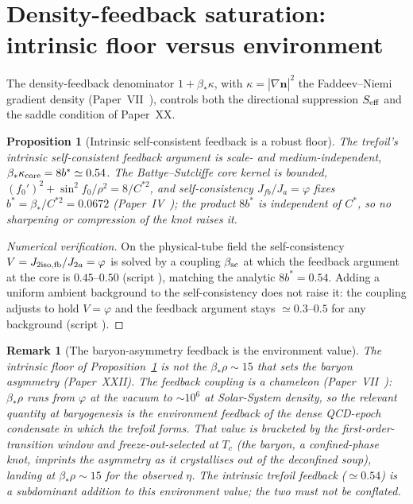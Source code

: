 \documentclass[11pt,a4paper]{article}
\newtheorem{proposition}[theorem]{Proposition}
\newtheorem{remark}[theorem]{Remark}
\theoremstyle{definition}\newtheorem{definition}[theorem]{Definition}
\newcommand{\vp}{\varphi}
\newcommand{\nhat}{\hat{\mathbf{n}}}
\begin{document}
\section{Density-feedback saturation: intrinsic floor versus environment}
\label{P23:sec:feedback}
The density-feedback denominator $1+\beta_*\kappa$, with $\kappa=|\nabla\nhat|^2$ the
Faddeev--Niemi gradient density (Paper~VII~\cite{Paper7}), controls both the directional
suppression $S_{\rm eff}$ and the saddle condition of Paper~XX.

\begin{proposition}[Intrinsic self-consistent feedback is a robust floor]
\label{P23:prop:floor}
The trefoil's \emph{intrinsic} self-consistent feedback argument is scale- and
medium-independent, $\beta_*\kappa_{\rm core}=8b^\ast\simeq0.54$. The Battye--Sutcliffe core
kernel is bounded, $(f_0')^2+\sin^2\!f_0/\rho^2=8/C^{\ast2}$, and self-consistency
$J_{fb}/J_a=\vp$ fixes $b^\ast=\beta_*/C^{\ast2}=0.0672$ (Paper~IV~\cite{Paper4}); the product
$8b^\ast$ is independent of $C^\ast$, so no sharpening or compression of the knot raises it.
\end{proposition}

\begin{proof}[Numerical verification]
On the physical-tube field the self-consistency $V=J_{2\rm iso,fb}/J_{2a}=\vp$ is solved by a
coupling $\beta_{\rm sc}$ at which the feedback argument at the core is $0.45$--$0.50$ (script
), matching the analytic $8b^\ast=0.54$. Adding a uniform ambient
background to the self-consistency does not raise it: the coupling adjusts to hold $V=\vp$ and the
feedback argument stays $\simeq0.3$--$0.5$ for any background (script ).
\end{proof}

\begin{remark}[The baryon-asymmetry feedback is the environment value]
\label{P23:rem:environment}
The intrinsic floor of Proposition~\ref{P23:prop:floor} is \emph{not} the $\beta_*\rho\sim15$ that
sets the baryon asymmetry (Paper~XXII). The feedback coupling is a chameleon
(Paper~VII~\cite{Paper7}): $\beta_*\rho$ runs from $\vp$ at the vacuum to $\sim10^6$ at
Solar-System density, so the relevant quantity at baryogenesis is the \emph{environment}
feedback of the dense QCD-epoch condensate in which the trefoil forms. That value is bracketed by
the first-order-transition window and freeze-out-selected at $T_c$ (the baryon, a confined-phase
knot, imprints the asymmetry as it crystallises out of the deconfined soup), landing at
$\beta_*\rho\sim15$ for the observed $\eta$. The intrinsic trefoil feedback ($\simeq0.54$) is a
subdominant addition to this environment value; the two must not be conflated.
\end{remark}
\end{document}
